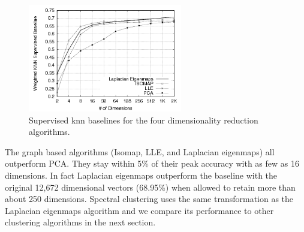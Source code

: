 \begin{figure}[h] \centering
\includegraphics[width=0.6\textwidth]{baseline_graph_mono.png}
\caption{Supervised knn baselines for the four dimensionality
  reduction algorithms.}
\label{fig:dimreduce}
\end{figure}

% 

The graph based algorithms (Isomap, LLE, and Laplacian eigenmaps) all
outperform PCA.  They stay within 5\% of their peak accuracy with as
few as 16 dimensions.  In fact Laplacian eigenmaps outperform the
baseline with the original 12,672 dimensional vectors (68.95\%) when
allowed to retain more than about 250 dimensions.  Spectral clustering
uses the same transformation as the Laplacian eigenmaps algorithm and
we compare its performance to other clustering algorithms in the next
section.

